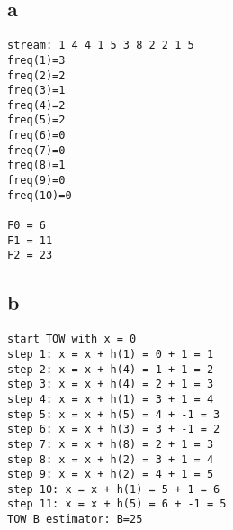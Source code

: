 \subsection*{a}
\begin{verbatim}
stream: 1 4 4 1 5 3 8 2 2 1 5 
freq(1)=3
freq(2)=2
freq(3)=1
freq(4)=2
freq(5)=2
freq(6)=0
freq(7)=0
freq(8)=1
freq(9)=0
freq(10)=0

F0 = 6
F1 = 11
F2 = 23
\end{verbatim}

\subsection*{b}
\begin{verbatim}
start TOW with x = 0
step 1: x = x + h(1) = 0 + 1 = 1
step 2: x = x + h(4) = 1 + 1 = 2
step 3: x = x + h(4) = 2 + 1 = 3
step 4: x = x + h(1) = 3 + 1 = 4
step 5: x = x + h(5) = 4 + -1 = 3
step 6: x = x + h(3) = 3 + -1 = 2
step 7: x = x + h(8) = 2 + 1 = 3
step 8: x = x + h(2) = 3 + 1 = 4
step 9: x = x + h(2) = 4 + 1 = 5
step 10: x = x + h(1) = 5 + 1 = 6
step 11: x = x + h(5) = 6 + -1 = 5
TOW B estimator: B=25
\end{verbatim}